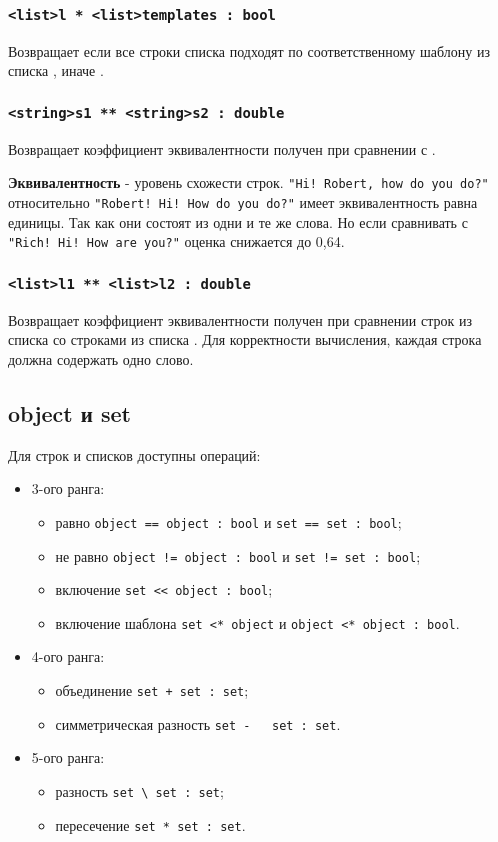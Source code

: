 \documentclass[a4paper, 14pt]{extarticle}
\newenvironment{icItems}
	{ \begin{itemize} [noitemsep,nolistsep] }
	{ \end{itemize} }
\begin{document}
\subsubsection{\lstinline`<list>l * <list>templates : bool`}
Возвращает  если все строки списка  подходят по соответственному шаблону из списка , иначе .

\subsubsection{\lstinline`<string>s1 ** <string>s2 : double`}
Возвращает коэффициент эквивалентности получен при сравнении  с .
	
{\bf Эквивалентность} - уровень схожести строк. \lstinline`"Hi! Robert, how do you do?"` относительно \lstinline`"Robert! Hi! How do you do?"` имеет эквивалентность равна единицы. Так как они состоят из одни и те же слова. Но если сравнивать с  \lstinline`"Rich! Hi! How are you?"` оценка снижается до 0,64.

\subsubsection{\lstinline`<list>l1 ** <list>l2 : double`}
Возвращает коэффициент эквивалентности получен при сравнении строк из списка  со строками из списка .
Для корректности вычисления, каждая строка должна содержать одно слово.

\subsection{{\color{bluemarin}object} и {\color{bluemarin}set}}

Для строк и списков доступны операций:
\begin{icItems}
	\item 3-ого ранга:
		\begin{icItems}
		\item равно \lstinline`object == object : bool` и \lstinline`set == set : bool`;
		\item не равно \lstinline`object != object : bool` и \lstinline`set != set : bool`;
		\item включение \lstinline`set << object : bool`;
		\item включение шаблона \lstinline`set <* object` и \lstinline`object <* object : bool`.
		\end{icItems}
	\item 4-ого ранга:
		\begin{icItems}
		\item объединение \lstinline`set + set : set`;
		\item симметрическая разность \lstinline`set -   set : set`.
		\end{icItems}
	\item 5-ого ранга:
		\begin{icItems}
		\item разность \lstinline`set \ set : set`;
		\item пересечение \lstinline`set * set : set`.
		\end{icItems}
\end{icItems}
\end{document}

